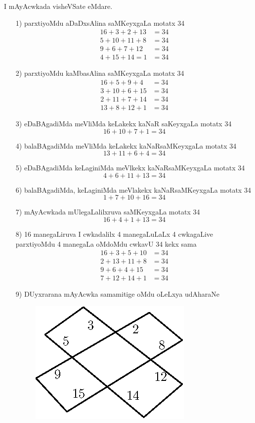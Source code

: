 I mAyAcwkada visheVSate eMdare.
\begin{enumerate}
\item[{\rm 1)}] parxtiyoMdu aDaDxsAlina saMKeyxgaLa motatx {\rm 34}
\begin{align*}
16+3+2+13 &=34\\
5+10+11+8 &=34\\
9+6+7+12 & =34\\
4+15+14=1 &=34
\end{align*}

\item[{\rm 2)}] parxtiyoMdu kaMbasAlina saMKeyxgaLa motatx {\rm 34}
\begin{align*}
16+5+9+4 &=34\\
3+10+6+15 &=34\\
2+11+7+14 & =34\\
13+8+12+1 &=34
\end{align*}

\item[{\rm 3)}] eDaBAgadiMda meVliMda keLakekx kaNaR saKeyxgaLa motatx {\rm 34}
$$
16+10+7+1=34
$$

\item[{\rm 4)}] balaBAgadiMda meVliMda keLakekx kaNaRsaMKeyxgaLa motatx {\rm 34}
$$
13+11+6+4 =34
$$

\item[{\rm 5)}] eDaBAgadiMda keLaginiMda meVlkekx kaNaRsaMKeyxgaLa motatx {\rm 34}
$$
4+6+11+13=34
$$

\item[{\rm 6)}] balaBAgadiMda, keLaginiMda meVlakekx kaNaRsaMKeyxgaLa motatx {\rm 34}
$$
1+7+10+16=34
$$

\item[{\rm 7)}] mAyAcwkada mUlegaLalilxruva saMKeyxgaLa motatx {\rm 34}
$$
16+4+1+13=34
$$ 

\item[{\rm 8)}] {\rm 16} manegaLiruva I cwkadalilx {\rm 4} manegaLuLaLx {\rm 4} cwkagaLive parxtiyoMdu {\rm 4} manegaLa oMdoMdu cwkavU {\rm 34} kekx sama
\begin{align*}
16+3+5+10 &=34\\
2+13+11+8 &=34\\
9+6+4+15 & =34\\
7+12+14+1 &=34
\end{align*}

\item[{\rm 9)}] DUyxrarana mAyAcwka samamitige oMdu oLeLxya udAharaNe
\begin{figure}[H]
\centering
\includegraphics[scale=.8]{src/figures/m_121.eps}
\end{figure}


\end{enumerate}
